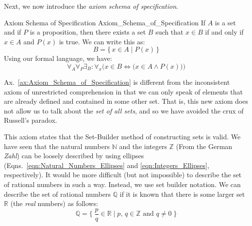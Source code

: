         Next, we now introduce the \textit{axiom schema of specification}.
        \begin{faxiom}{Axiom Schema of Specification}
                      {Axiom_Schema_of_Specification}
            If $A$ is a set and if $P$ is a proposition, then there exists a set
            $B$ such that $x\in{B}$ if and only if $x\in{A}$ and $P(x)$ is true.
            We can write this as:
            \begin{equation*}
                B=\big\{\,x\in{A}\;|\;P(x)\,\big\}
            \end{equation*}
            Using our formal language, we have:
            \begin{equation*}
                \forall_{A}\forall_{P}\exists_{B}:
                \forall_{x}\Big(x\in{B}\Leftrightarrow
                \big(x\in{A}\land{P}(x)\big)\Big)
            \end{equation*}
        \end{faxiom}
        Ax.~\ref{ax:Axiom_Schema_of_Specification} is different from the
        inconsistent axiom of unrestricted comprehension%
         in that we can only speak of
        elements that are already defined and contained in some other set. That
        is, this new axiom does not allow us to talk about the
        \textit{set of all sets}, and so we have avoided
        the crux of Russell's paradox.
        \par\hfill\par
        This axiom states that the Set-Builder method of constructing sets is
        valid. We have seen that the natural numbers $\mathbb{N}$ and the
        integers $\mathbb{Z}$ (From the German \textit{Zahl}) can be loosely
        described by using ellipses (Eqns.~\ref{eqn:Natural_Numbers_Ellipses}
        and \ref{eqn:Integers_Ellipses}, respectively). It would be more
        difficult (but not impossible) to describe the set of rational numbers%
         in such a way. Instead, we use set builder
        notation. We can describe the set of rational numbers $\mathbb{Q}$ if it
        is known that there is some larger set $\mathbb{R}$
        (the \textit{real} numbers) as follows:
        \begin{equation}
            \mathbb{Q}=\Big\{\;\frac{p}{q}\in\mathbb{R}\;\big|\;
                                p,\,q\in\mathbb{Z}\textrm{ and }q\ne{0}\;\Big\}
        \end{equation}
